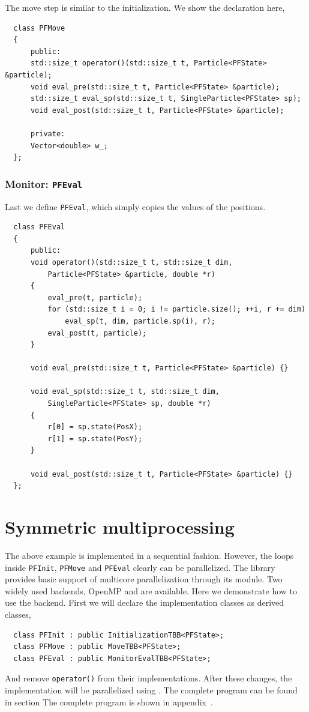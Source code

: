The move step is similar to the initialization. We show the declaration here,
\begin{Verbatim}
  class PFMove
  {
      public:
      std::size_t operator()(std::size_t t, Particle<PFState> &particle);
      void eval_pre(std::size_t t, Particle<PFState> &particle);
      std::size_t eval_sp(std::size_t t, SingleParticle<PFState> sp);
      void eval_post(std::size_t t, Particle<PFState> &particle);

      private:
      Vector<double> w_;
  };
\end{Verbatim}

\subsubsection{Monitor: \texttt{PFEval}}

Last we define \verb|PFEval|, which simply copies the values of the positions.
\begin{Verbatim}
  class PFEval
  {
      public:
      void operator()(std::size_t t, std::size_t dim,
          Particle<PFState> &particle, double *r)
      {
          eval_pre(t, particle);
          for (std::size_t i = 0; i != particle.size(); ++i, r += dim)
              eval_sp(t, dim, particle.sp(i), r);
          eval_post(t, particle);
      }

      void eval_pre(std::size_t t, Particle<PFState> &particle) {}

      void eval_sp(std::size_t t, std::size_t dim,
          SingleParticle<PFState> sp, double *r)
      {
          r[0] = sp.state(PosX);
          r[1] = sp.state(PosY);
      }

      void eval_post(std::size_t t, Particle<PFState> &particle) {}
  };
\end{Verbatim}

\section{Symmetric multiprocessing}
\label{sec:Symmetric multiprocessing}

The above example is implemented in a sequential fashion. However, the loops
inside \verb|PFInit|, \verb|PFMove| and \verb|PFEval| clearly can be
parallelized. The library provides basic support of multicore parallelization
through its \smp module. Two widely used backends, OpenMP and \tbb are
available. Here we demonstrate how to use the \tbb backend. First we will
declare the implementation classes as derived classes,
\begin{Verbatim}
  class PFInit : public InitializationTBB<PFState>;
  class PFMove : public MoveTBB<PFState>;
  class PFEval : public MonitorEvalTBB<PFState>;
\end{Verbatim}
And remove \verb|operator()| from their implementations. After these changes,
the implementation will be parallelized using \tbb. The complete program can be
found in section The complete program is shown in
appendix~.

